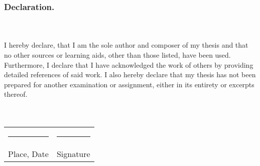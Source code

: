 \subsubsection{Declaration.}\hfill\\\\
\noindent I hereby declare, that I am the sole author and composer of my thesis and that no other sources or learning aids, other than those listed, have been used. 
Furthermore, I declare that I have acknowledged the work of others by providing detailed references of said work.  \newline
I also hereby declare that my thesis has not been prepared for another examination or assignment, either in its entirety or excerpts thereof. 
\\
\\
\\
\begin{tabular}{p{} l}
  \rule{\textwidth/3}{0.4pt}   &   \rule{\textwidth/3}{0.4pt} \\
  Place, Date                  &   Signature
\end{tabular}